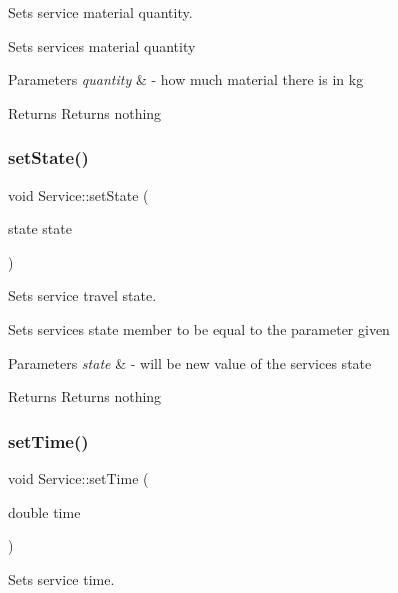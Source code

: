 Sets service material quantity. 

Sets service\textquotesingle{}s material quantity 
\begin{DoxyParams}{Parameters}
{\em quantity} & -\/ how much material there is in kg \\
\hline
\end{DoxyParams}
\begin{DoxyReturn}{Returns}
Returns nothing 
\end{DoxyReturn}
\mbox{\label{class_service_a7aa57d557be113ce2025843cb1046137}} 
\subsubsection{\texorpdfstring{set\+State()}{setState()}}
{\footnotesize\ttfamily void Service\+::set\+State (\begin{DoxyParamCaption}\item[{state state}]{ }\end{DoxyParamCaption})}



Sets service travel state. 

Sets service\textquotesingle{}s state member to be equal to the parameter given 
\begin{DoxyParams}{Parameters}
{\em state} & -\/ will be new value of the service\textquotesingle{}s state \\
\hline
\end{DoxyParams}
\begin{DoxyReturn}{Returns}
Returns nothing 
\end{DoxyReturn}
\mbox{\label{class_service_aed76805ea044b29f0dafe65a7d39f2dc}} 
\subsubsection{\texorpdfstring{set\+Time()}{setTime()}}
{\footnotesize\ttfamily void Service\+::set\+Time (\begin{DoxyParamCaption}\item[{double}]{time }\end{DoxyParamCaption})}



Sets service time. 

